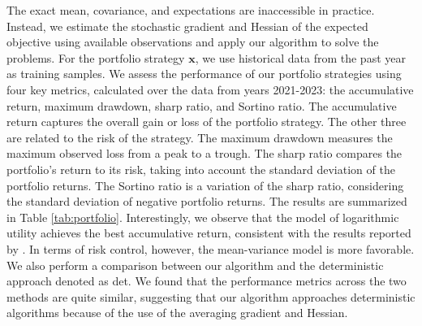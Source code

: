 \documentclass[aos]{imsart}
\numberwithin{equation}{section}
\theoremstyle{plain}
\begin{document}
\begin{table}[h]
  \centering
  \caption{Fama-French 100 Portfolios DataSet, 2021-2023}
\label{tab:portfolio}
\end{table}



The exact mean, covariance, and expectations are inaccessible in practice. Instead, we estimate the stochastic gradient and Hessian of the expected objective using available observations and apply our algorithm to solve the problems. For the portfolio strategy $\bm{x}$, we use historical data from the past year as training samples. 
We assess the performance of our portfolio strategies using four key metrics, calculated over the data from years 2021-2023: the accumulative return, maximum drawdown, sharp ratio, and Sortino ratio. The accumulative return captures the overall gain or loss of the portfolio strategy. The other three are related to the risk of the strategy. The maximum drawdown measures the maximum observed loss from a peak to a trough. The sharp ratio compares the portfolio's return to its risk, taking into account the standard deviation of the portfolio returns. The Sortino ratio is a variation of the sharp ratio, considering the standard deviation of negative portfolio returns. The results are summarized in Table \ref{tab:portfolio}. Interestingly, we observe that the model of logarithmic utility achieves the best accumulative return, consistent with the results reported by \cite{du2023high}. In terms of risk control, however, the mean-variance model is more favorable. We also perform a comparison between our algorithm and the deterministic approach denoted as det. We found that the performance metrics across the two methods are quite similar, suggesting that our algorithm approaches deterministic algorithms because of the use of the averaging gradient and Hessian.
\end{document}
